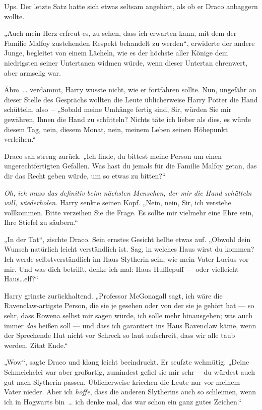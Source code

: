 Ups. Der letzte Satz hatte sich etwas seltsam angehört, als ob er Draco anbaggern wollte.

„Auch mein Herz erfreut es, zu sehen, dass ich erwarten kann, mit dem der Familie Malfoy zustehenden Respekt behandelt zu werden“, erwiderte der andere Junge, begleitet von einem Lächeln, wie es der höchste aller Könige dem niedrigsten seiner Untertanen widmen würde, wenn dieser Untertan ehrenwert, aber armselig war.

Ähm … verdammt, Harry wusste nicht, wie er fortfahren sollte. Nun, ungefähr an dieser Stelle des Gesprächs wollten die Leute üblicherweise Harry Potter die Hand schütteln, also – „Sobald meine Umhänge fertig sind, Sir, würden Sie mir gewähren, Ihnen die Hand zu schütteln? Nichts täte ich lieber als dies, es würde diesem Tag, nein, diesem Monat, nein, meinem Leben seinen Höhepunkt verleihen.“

Draco sah streng zurück. „Ich finde, du bittest meine Person um einen ungerechtfertigten Gefallen. Was hast du jemals für die Familie Malfoy getan, das dir das Recht geben würde, um so etwas zu bitten?“

\emph{Oh, ich muss das definitiv beim nächsten Menschen, der mir die Hand schütteln will, wiederholen.} Harry senkte seinen Kopf. „Nein, nein, Sir, ich verstehe vollkommen. Bitte verzeihen Sie die Frage. Es sollte mir vielmehr eine Ehre sein, Ihre Stiefel zu säubern.“

„In der Tat“, zischte Draco. Sein ernstes Gesicht hellte etwas auf. „Obwohl dein Wunsch natürlich leicht verständlich ist. Sag, in welches Haus wirst du kommen? Ich werde selbstverständlich im Haus Slytherin sein, wie mein Vater Lucius vor mir. Und was dich betrifft, denke ich mal: Haus Hufflepuff — oder vielleicht Haus…elf?“

Harry grinste zurückhaltend. „Professor McGonagall sagt, ich wäre die Ravenclaw-artigste Person, die sie je gesehen oder von der sie je gehört hat — so sehr, dass Rowena selbst mir sagen würde, ich solle mehr hinausgehen; was auch immer \emph{das} heißen soll — und dass ich garantiert ins Haus Ravenclaw käme, wenn der Sprechende Hut nicht vor Schreck so laut aufschreit, dass wir alle taub werden. Zitat Ende.“

„Wow“, sagte Draco und klang leicht beeindruckt. Er seufzte wehmütig. „Deine Schmeichelei war aber großartig, zumindest gefiel sie mir sehr – du würdest auch gut nach Slytherin passen. Üblicherweise kriechen die Leute nur vor meinem Vater nieder. Aber ich \emph{hoffe}, dass die anderen Slytherins auch so schleimen, wenn ich in Hogwarts bin … ich denke mal, das war schon ein ganz gutes Zeichen.“

